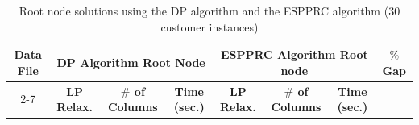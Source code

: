  
\begin{table}
\centering
\caption {Root node solutions using the DP algorithm and the ESPPRC algorithm (30 customer instances)} \label{dp-espprc30}
\begin {tabular}[b]{|c|c|c|c|c|c|c|c|}
\hline
{\bf Data File} & \multicolumn{3}{|c|}{{\bf DP Algorithm Root Node}} &  \multicolumn {3}{|c|}{{\bf ESPPRC Algorithm Root node}} & {\bf $\%$Gap}\\ \cline {2-7}
\mbox{} & {\bf LP Relax.} & {\bf $\#$ of Columns} & {\bf	Time (sec.)} &	{\bf LP Relax.}	& {\bf $\#$ of Columns}	& {\bf Time (sec.)} & \mbox{} \\\hline


\end{tabular}
\end{table}
